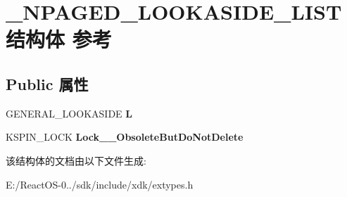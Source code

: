\hypertarget{struct___n_p_a_g_e_d___l_o_o_k_a_s_i_d_e___l_i_s_t}{}\section{\+\_\+\+N\+P\+A\+G\+E\+D\+\_\+\+L\+O\+O\+K\+A\+S\+I\+D\+E\+\_\+\+L\+I\+S\+T结构体 参考}
\label{struct___n_p_a_g_e_d___l_o_o_k_a_s_i_d_e___l_i_s_t}
\subsection*{Public 属性}
\begin{DoxyCompactItemize}
\item 
\mbox{\label{struct___n_p_a_g_e_d___l_o_o_k_a_s_i_d_e___l_i_s_t_aafb259e3346fce9cb22a62dd425fa869}} 
G\+E\+N\+E\+R\+A\+L\+\_\+\+L\+O\+O\+K\+A\+S\+I\+DE {\bfseries L}
\item 
\mbox{\label{struct___n_p_a_g_e_d___l_o_o_k_a_s_i_d_e___l_i_s_t_a7f85cfc1e66f0f11ba4b30e6a7858f97}} 
K\+S\+P\+I\+N\+\_\+\+L\+O\+CK {\bfseries Lock\+\_\+\+\_\+\+Obsolete\+But\+Do\+Not\+Delete}
\end{DoxyCompactItemize}


该结构体的文档由以下文件生成\+:\begin{DoxyCompactItemize}
\item 
E\+:/\+React\+O\+S-\/0../sdk/include/xdk/extypes.\+h\end{DoxyCompactItemize}
